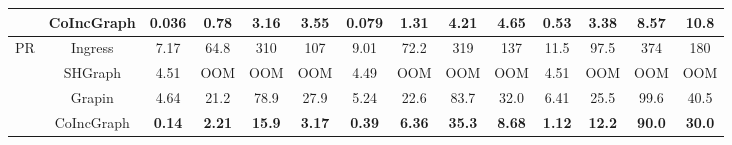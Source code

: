 \begin{table}[t]
\begin{tabular*}{0.859\textwidth}{c|c|cccc|cccc|cccc}
& CoIncGraph & \textbf{0.036} & \textbf{0.78} & \textbf{3.16} & \textbf{3.55} & \textbf{0.079} & \textbf{1.31} & \textbf{4.21} & \textbf{4.65} & \textbf{0.53} & \textbf{3.38} & \textbf{8.57} & \textbf{10.8} \\
\hline
\multirow{4}{*}{PR}
& Ingress    & 7.17 & 64.8 & 310 & 107 & 9.01 & 72.2 & 319 & 137 & 11.5 & 97.5 & 374 & 180 \\
& SHGraph    & 4.51 & OOM & OOM & OOM & 4.49 & OOM & OOM & OOM & 4.51 & OOM & OOM & OOM \\
& Grapin     & 4.64 & 21.2 & 78.9 & 27.9 & 5.24 & 22.6 & 83.7 & 32.0 & 6.41 & 25.5 & 99.6 & 40.5 \\
& CoIncGraph & \textbf{0.14} & \textbf{2.21} & \textbf{15.9} & \textbf{3.17} & \textbf{0.39} & \textbf{6.36} & \textbf{35.3} & \textbf{8.68} & \textbf{1.12} & \textbf{12.2} & \textbf{90.0} & \textbf{30.0} \\
\hline
\end{tabular*}
\end{table}

